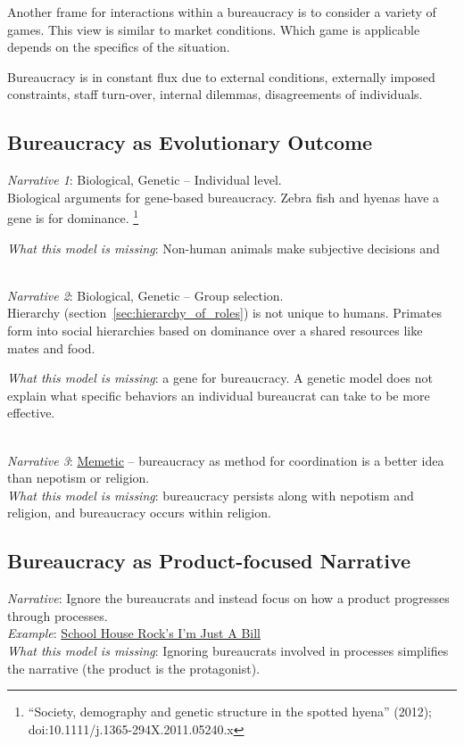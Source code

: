 
Another frame for interactions within a bureaucracy is to consider a variety of games. This view is similar to market conditions. Which game is applicable depends on the specifics of the situation. 

Bureaucracy is in constant flux due to external conditions, externally imposed constraints, staff turn-over, internal dilemmas, disagreements of individuals. 




\subsection*{Bureaucracy as Evolutionary Outcome}


\textit{Narrative 1}: Biological, Genetic -- Individual level. \\
Biological arguments for gene-based bureaucracy. Zebra fish and hyenas have a gene is for dominance. \footnote{``Society, demography and genetic structure in the spotted hyena'' (2012); doi:10.1111/j.1365-294X.2011.05240.x}


\textit{What this model is missing}: Non-human animals make subjective decisions and 

\ \\

\textit{Narrative 2}: Biological, Genetic -- Group selection. \\
Hierarchy (section~\ref{sec:hierarchy_of_roles}) is not unique to humans. Primates form into social hierarchies based on dominance over a shared resources like mates and food.

\textit{What this model is missing}: a gene for bureaucracy. A genetic model does not explain what specific behaviors an individual bureaucrat can take to be more effective. 

\ \\

\textit{Narrative 3}: \href{https://en.wikipedia.org/wiki/Memetics}{Memetic} -- bureaucracy as method for coordination is a better idea than nepotism or religion. \\
\textit{What this model is missing}: bureaucracy persists along with nepotism and religion, and bureaucracy occurs within religion. 

\subsection*{Bureaucracy as Product-focused Narrative}
\textit{Narrative}: Ignore the bureaucrats and instead focus on how a product progresses through processes.\\
\textit{Example}: \href{https://www.youtube.com/watch?v=OgVKvqTItto}{School House Rock's I'm Just A Bill}\\
\textit{What this model is missing}: Ignoring bureaucrats involved in processes simplifies the narrative (the product is the protagonist). 

